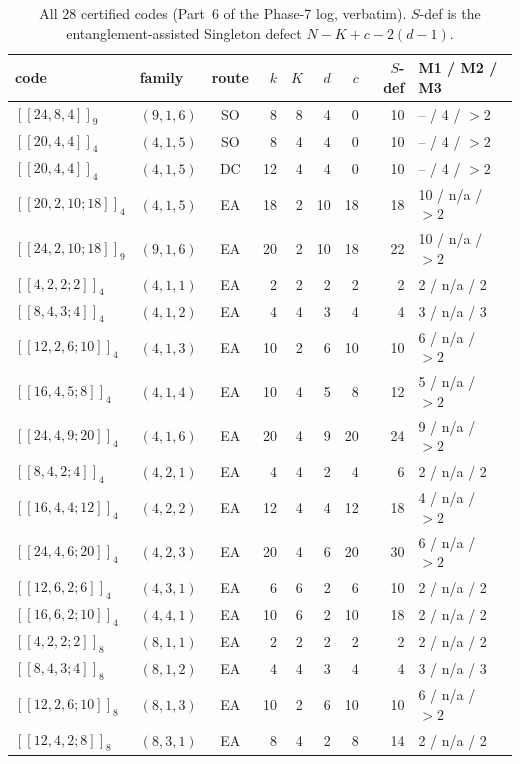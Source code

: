 \begin{table}[ht]
\centering
\small
\caption{All $28$ certified codes (Part~6 of the Phase-7 log, verbatim).
$S$-def is the entanglement-assisted Singleton defect $N-K+c-2(d-1)$.}
\label{tab:cert}
\begin{tabular}{@{}llcrrrrrl@{}}
\toprule
code & family & route & $k$ & $K$ & $d$ & $c$
 & $S$-def & M1 / M2 / M3\\
\midrule
$[[24,8,4]]_9$   & $(9,1,6)$ & SO & 8  & 8  & 4  & 0  & 10 & -- / 4 / $>2$\\
$[[20,4,4]]_4$   & $(4,1,5)$ & SO & 8  & 4  & 4  & 0  & 10 & -- / 4 / $>2$\\
$[[20,4,4]]_4$   & $(4,1,5)$ & DC & 12 & 4  & 4  & 0  & 10 & -- / 4 / $>2$\\
$[[20,2,10;18]]_4$ & $(4,1,5)$ & EA & 18 & 2  & 10 & 18 & 18 & 10 / n/a / $>2$\\
$[[24,2,10;18]]_9$ & $(9,1,6)$ & EA & 20 & 2  & 10 & 18 & 22 & 10 / n/a / $>2$\\
$[[4,2,2;2]]_4$  & $(4,1,1)$ & EA & 2  & 2  & 2  & 2  & 2  & 2 / n/a / 2\\
$[[8,4,3;4]]_4$  & $(4,1,2)$ & EA & 4  & 4  & 3  & 4  & 4  & 3 / n/a / 3\\
$[[12,2,6;10]]_4$ & $(4,1,3)$ & EA & 10 & 2  & 6  & 10 & 10 & 6 / n/a / $>2$\\
$[[16,4,5;8]]_4$ & $(4,1,4)$ & EA & 10 & 4  & 5  & 8  & 12 & 5 / n/a / $>2$\\
$[[24,4,9;20]]_4$ & $(4,1,6)$ & EA & 20 & 4  & 9  & 20 & 24 & 9 / n/a / $>2$\\
$[[8,4,2;4]]_4$  & $(4,2,1)$ & EA & 4  & 4  & 2  & 4  & 6  & 2 / n/a / 2\\
$[[16,4,4;12]]_4$ & $(4,2,2)$ & EA & 12 & 4  & 4  & 12 & 18 & 4 / n/a / $>2$\\
$[[24,4,6;20]]_4$ & $(4,2,3)$ & EA & 20 & 4  & 6  & 20 & 30 & 6 / n/a / $>2$\\
$[[12,6,2;6]]_4$ & $(4,3,1)$ & EA & 6  & 6  & 2  & 6  & 10 & 2 / n/a / 2\\
$[[16,6,2;10]]_4$ & $(4,4,1)$ & EA & 10 & 6  & 2  & 10 & 18 & 2 / n/a / 2\\
$[[4,2,2;2]]_8$  & $(8,1,1)$ & EA & 2  & 2  & 2  & 2  & 2  & 2 / n/a / 2\\
$[[8,4,3;4]]_8$  & $(8,1,2)$ & EA & 4  & 4  & 3  & 4  & 4  & 3 / n/a / 3\\
$[[12,2,6;10]]_8$ & $(8,1,3)$ & EA & 10 & 2  & 6  & 10 & 10 & 6 / n/a / $>2$\\
$[[12,4,2;8]]_8$ & $(8,3,1)$ & EA & 8  & 4  & 2  & 8  & 14 & 2 / n/a / 2\\

\end{tabular}
\end{table}
